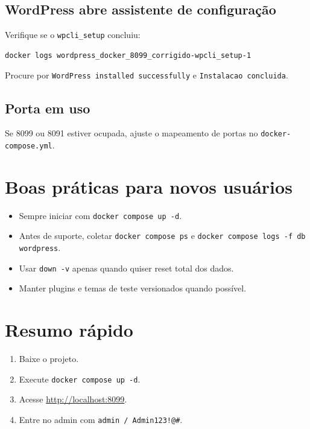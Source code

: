 ﻿\documentclass[12pt,a4paper]{article}
\begin{document}
\subsection{WordPress abre assistente de configura\c{c}\~ao}
Verifique se o \texttt{wpcli\_setup} concluiu:
\begin{verbatim}
docker logs wordpress_docker_8099_corrigido-wpcli_setup-1
\end{verbatim}
Procure por \texttt{WordPress installed successfully} e \texttt{Instalacao concluida}.

\subsection{Porta em uso}
Se 8099 ou 8091 estiver ocupada, ajuste o mapeamento de portas no \texttt{docker-compose.yml}.

\section{Boas pr\'aticas para novos usu\'arios}
\begin{itemize}
  \item Sempre iniciar com \texttt{docker compose up -d}.
  \item Antes de suporte, coletar \texttt{docker compose ps} e \texttt{docker compose logs -f db wordpress}.
  \item Usar \texttt{down -v} apenas quando quiser reset total dos dados.
  \item Manter plugins e temas de teste versionados quando poss\'ivel.
\end{itemize}

\section{Resumo r\'apido}
\begin{enumerate}
  \item Baixe o projeto.
  \item Execute \texttt{docker compose up -d}.
  \item Acesse \url{http://localhost:8099}.
  \item Entre no admin com \texttt{admin / Admin123!@\#}.
\end{enumerate}
\end{document}
